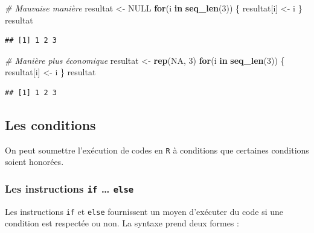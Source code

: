 \documentclass[
  11pt,
]{book}
\newenvironment{Shaded}{\begin{snugshade}}{\end{snugshade}}
\newcommand{\CommentTok}[1]{\textcolor[rgb]{0.56,0.35,0.01}{\textit{#1}}}
\newcommand{\ControlFlowTok}[1]{\textcolor[rgb]{0.13,0.29,0.53}{\textbf{#1}}}
\newcommand{\DecValTok}[1]{\textcolor[rgb]{0.00,0.00,0.81}{#1}}
\newcommand{\KeywordTok}[1]{\textcolor[rgb]{0.13,0.29,0.53}{\textbf{#1}}}
\newcommand{\NormalTok}[1]{#1}
\newcommand{\OtherTok}[1]{\textcolor[rgb]{0.56,0.35,0.01}{#1}}
\newcommand{\StringTok}[1]{\textcolor[rgb]{0.31,0.60,0.02}{#1}}
\numberwithin{equation}{section}
\numberwithin{countremarque}{section}
\begin{document}
\begin{Shaded}
\begin{Highlighting}[]
\CommentTok{\# Mauvaise manière}
\NormalTok{resultat \textless{}{-}}\StringTok{ }\OtherTok{NULL}
\ControlFlowTok{for}\NormalTok{(i }\ControlFlowTok{in} \KeywordTok{seq\_len}\NormalTok{(}\DecValTok{3}\NormalTok{)) \{}
\NormalTok{  resultat[i] \textless{}{-}}\StringTok{ }\NormalTok{i}
\NormalTok{\}}
\NormalTok{resultat}
\end{Highlighting}
\end{Shaded}

\begin{lstlisting}
## [1] 1 2 3
\end{lstlisting}

\begin{Shaded}
\begin{Highlighting}[]
\CommentTok{\# Manière plus économique}
\NormalTok{resultat \textless{}{-}}\StringTok{ }\KeywordTok{rep}\NormalTok{(}\OtherTok{NA}\NormalTok{, }\DecValTok{3}\NormalTok{)}
\ControlFlowTok{for}\NormalTok{(i }\ControlFlowTok{in} \KeywordTok{seq\_len}\NormalTok{(}\DecValTok{3}\NormalTok{)) \{}
\NormalTok{  resultat[i] \textless{}{-}}\StringTok{ }\NormalTok{i}
\NormalTok{\}}
\NormalTok{resultat}
\end{Highlighting}
\end{Shaded}

\begin{lstlisting}
## [1] 1 2 3
\end{lstlisting}

\hypertarget{boucles_boucles_conditions}{%
\subsection{Les conditions}\label{boucles_boucles_conditions}}

On peut soumettre l'exécution de codes en \texttt{R} à conditions que certaines conditions soient honorées.

\hypertarget{boucles_boucles_conditions_if}{%
\subsubsection{\texorpdfstring{Les instructions \texttt{if} \ldots{} \texttt{else}}{Les instructions if \ldots{} else}}\label{boucles_boucles_conditions_if}}

Les instructions \texttt{if} et \texttt{else} fournissent un moyen d'exécuter du code si une condition est respectée ou non. La syntaxe prend deux formes :
\end{document}
